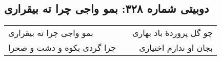\begin{center}
\section*{دوبیتی شماره ۳۲۸: بمو واجی چرا ته بیقراری}
\label{sec:328}
\begin{longtable}{l p{0.5cm} r}
بمو واجی چرا ته بیقراری
&&
چو گل پروردهٔ باد بهاری
\\
چرا گردی بکوه و دشت و صحرا
&&
بجان او ندارم اختیاری
\\
\end{longtable}
\end{center}
